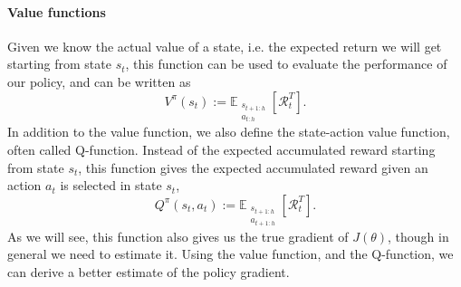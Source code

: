 \documentclass[conference, final]{IEEEtran}
\begin{document}
\paragraph{Value functions} 
Given we know the actual value of a state, i.e. the expected return we will get starting from state $s_t$, this function can be used to evaluate the performance of our policy, and can be written as
\begin{equation}
	V^{\pi}(s_t) := \mathbb{E}_{\substack{s_{t+1:h} \\ a_{t:h}}}\left[\mathcal{R}_t^T\right].
	\label{eqn:v}
\end{equation}
In addition to the value function, we also define the state-action value function, often called Q-function. 
Instead of the expected accumulated reward starting from state $s_t$, this function gives the expected accumulated reward given an action $a_t$ is selected in state $s_t$, 
\begin{equation}
	Q^{\pi}(s_t, a_t) := \mathbb{E}_{\substack{s_{t+1:h} \\ a_{t+1:h}}}\left[\mathcal{R}_t^T\right].
	\label{eqn:q}
\end{equation}
As we will see, this function also gives us the true gradient of $J(\theta)$, though in general we need to estimate it. 
Using the value function, and the Q-function, we can derive a better estimate of the policy gradient.
\end{document}

